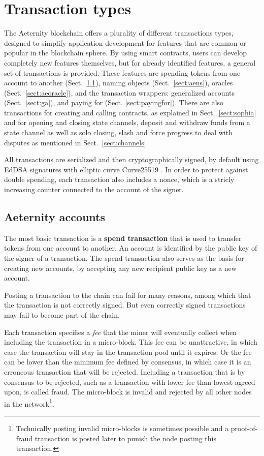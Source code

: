 \section{Transaction types}
\label{sect:transactions}

The Aeternity blockchain offers a plurality of different transactions
types, designed to simplify application development for features that are
common or popular in the blockchain sphere. By using smart contracts,
users can develop completely new features themselves, but for already
identified features, a general set of transactions is
provided. These features are spending tokens from one account to
another (Sect.\ \ref{sect:aespend}), naming objects (Sect.\
\ref{sect:aens}), oracles (Sect.\ \ref{sect:aeoracle}), and the
transaction wrappers: generalized
accounts (Sect.\ \ref{sect:ga}), and paying for
(Sect. \ref{sect:payingfor}).
There are also transactions for creating and calling contracts, as
explained in Sect.\ \ref{sect:sophia} and for opening and closing
state channels, deposit and withdraw funds from a state channel as
well as solo closing, slash and force progress to deal with
disputes as mentioned in Sect.\ \ref{sect:channels}.

All transactions are serialized and then cryptographically signed, by default using EdDSA \cite{bernstein2012high}
signatures with elliptic curve Curve25519
\cite{bernstein2006curve25519}. In order to protect against double
spending, each transaction also includes a nonce, which is a stricly
increasing counter connected to the account of the signer.

\subsection{Aeternity accounts}
\label{sect:aespend}

The most basic transaction is a \textbf{spend
transaction} that is used to transfer tokens from one account to
another. An account is identified by the public key of the signer of
a transaction. The spend transaction also serves as the basis for
creating new accounts, by accepting any new recipient public key as a new
account.

Posting a transaction to the chain can fail for many reasons, among
which that the transaction is not correctly signed. But even correctly
signed transactions may fail to become part of the chain.

Each transaction specifies a \textit{fee} that the miner will
     eventually collect when including the transaction in a
     micro-block. This fee can be unattractive, in which case the
     transaction will stay in the transaction pool until it
     expires. Or the fee can be lower than the minimum fee defined by
     consensus, in which case it is an erroneous transaction that
     will be rejected. Including a transaction that is by consensus to be rejected,  such as a
     transaction with lower fee than lowest agreed upon, is called
     fraud. The micro-block is invalid and rejected by
     all other nodes in the network\footnote{Technically posting
       invalid micro-blocks is sometimes possible and a proof-of-fraud
       transaction is posted later to punish the node posting this transaction.}.

